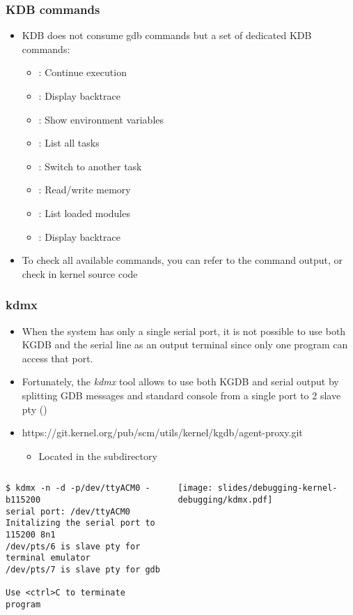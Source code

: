 \begin{frame}
  \frametitle{KDB commands}
  \begin{itemize}
    \item KDB does not consume gdb commands but a set of dedicated KDB
      commands:
      \begin{itemize}
        \item {}: Continue execution
        \item {}: Display backtrace
        \item {}: Show environment variables
        \item {}: List all tasks
        \item {}: Switch to another task
        \item {}: Read/write memory
        \item {}: List loaded modules
        \item {}: Display backtrace
      \end{itemize}
    \item To check all available commands, you can refer to the 
      command output, or check  in kernel source code
  \end{itemize}
\end{frame}

\begin{frame}[fragile]
  \frametitle{kdmx}
  \begin{itemize}
    \item When the system has only a single serial port, it is not possible to
          use both KGDB and the serial line as an output terminal since only one
          program can access that port.
    \item Fortunately, the {\em kdmx} tool allows to use both KGDB and serial
          output by splitting GDB messages and standard console from a single
          port to 2 slave pty ()
    \item https://git.kernel.org/pub/scm/utils/kernel/kgdb/agent-proxy.git
    \begin{itemize}
      \item Located in the subdirectory 
    \end{itemize}
  \end{itemize}
  \begin{columns}
    \begin{block}{}
      \begin{verbatim}
$ kdmx -n -d -p/dev/ttyACM0 -b115200
serial port: /dev/ttyACM0
Initalizing the serial port to 115200 8n1
/dev/pts/6 is slave pty for terminal emulator
/dev/pts/7 is slave pty for gdb

Use <ctrl>C to terminate program
      \end{verbatim}
    \end{block}
    \texttt{[image: slides/debugging-kernel-debugging/kdmx.pdf]}
  \end{columns}
\end{frame}

